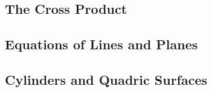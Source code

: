 \documentclass{article}
\begin{document}
    \subsection{The Cross Product}
    \begin{outline}
        \1 
    \end{outline}
    \subsection{Equations of Lines and Planes}
    \begin{outline}
        \1 
    \end{outline}
    \subsection{Cylinders and Quadric Surfaces}
    \begin{outline}
        \1 
    \end{outline}
\end{document}
